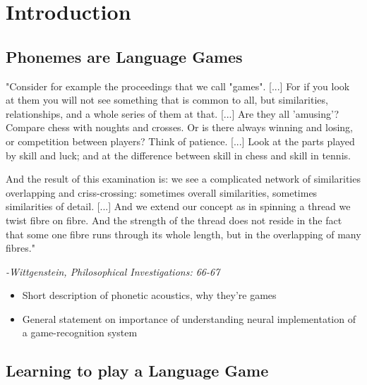 
% 

\section{Introduction}
\begin{multicols}{2}
\subsection{Phonemes are Language Games}

\begin{leftbar}

"Consider for example the proceedings that we call "games". [...] For if you look at them you will not see something that is common to all, but similarities, relationships, and a whole series of them at that. [...] Are they all 'amusing'? Compare chess with noughts and crosses. Or is there always winning and losing, or competition between players? Think of patience. [...] Look at the parts played by skill and luck; and at the difference between skill in chess and skill in tennis. 

And the result of this examination is: we see a complicated network
of similarities overlapping and criss-crossing: sometimes overall similarities, sometimes similarities of detail. [...] And we extend our concept as in spinning a thread we twist fibre on fibre. And the strength of the thread does not reside in the fact that some one fibre runs through its whole length, but in the overlapping of many fibres."

\textit{-Wittgenstein, Philosophical Investigations: 66-67\cite{wittgensteinPhilosophicalInvestigations1968}}

\end{leftbar}

\begin{itemize}
	\item Short description of phonetic acoustics, why they're games
	\item General statement on importance of understanding neural implementation of a game-recognition system
\end{itemize}

\subsection{Learning to play a Language Game}


\end{multicols}
